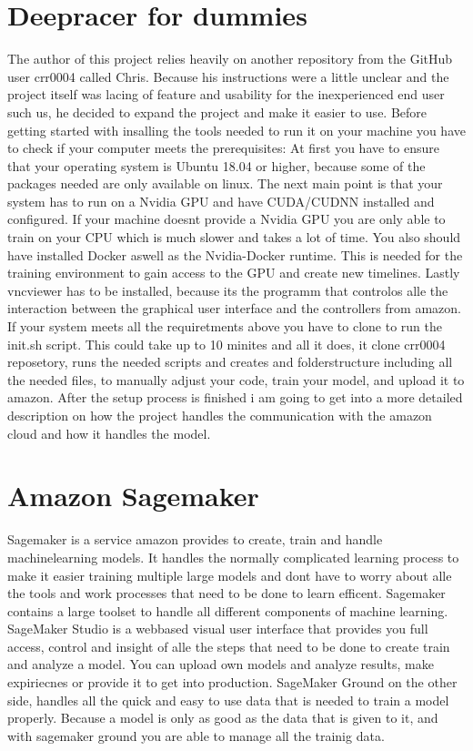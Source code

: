 \section{Deepracer for dummies}
The author of this project relies heavily on another repository from the GitHub user crr0004 called Chris. Because his instructions were a little unclear and the project itself was lacing of feature and usability for the inexperienced end user such us, he decided to expand the project and make it easier to use. 
Before getting started with insalling the tools needed to run it on your machine you have to check if your computer meets the prerequisites:
At first you have to ensure that your operating system is Ubuntu 18.04 or higher, because some of the packages needed are only available on linux.
The next main point is that your system has to run on a Nvidia GPU and have CUDA/CUDNN installed and configured. If your machine doesnt provide a Nvidia GPU you are only able to train on your CPU which is much slower and takes a lot of time.
You also should have installed Docker aswell as the Nvidia-Docker runtime. This is needed for the training environment to gain access to the GPU and create new timelines.
Lastly vncviewer  has to be installed, because its the programm that controlos alle the interaction between the graphical user interface and the controllers from amazon.
If your system meets all the requiretments above you have to clone to run the init.sh script.
This could take up to 10 minites and all it does, it clone crr0004 reposetory, runs the needed scripts and creates and folderstructure including all the needed files, to manually adjust your code, train your model, and upload it to amazon.
After the setup process is finished i am going to get into a more detailed description on how the project handles the communication with the amazon cloud and how it handles the model.

 \section{Amazon Sagemaker}
 Sagemaker is a service amazon provides to create, train and handle machinelearning models. It handles the normally complicated  learning process to make it easier training multiple large models and dont have to worry about alle the tools and work processes that need to be done to learn efficent. Sagemaker contains a large toolset to handle all different components of machine learning. 
 SageMaker Studio is a webbased visual user interface that provides you full access, control and insight of alle the steps that need to be done to create train and analyze a model. You can upload own models and analyze results, make expiriecnes or provide it to get into production. 
SageMaker Ground on the other side, handles all the quick and easy to use data that is needed to train a model properly. Because a model is only as good as the data that is given to it, and with sagemaker ground you are able to manage all the trainig data.

